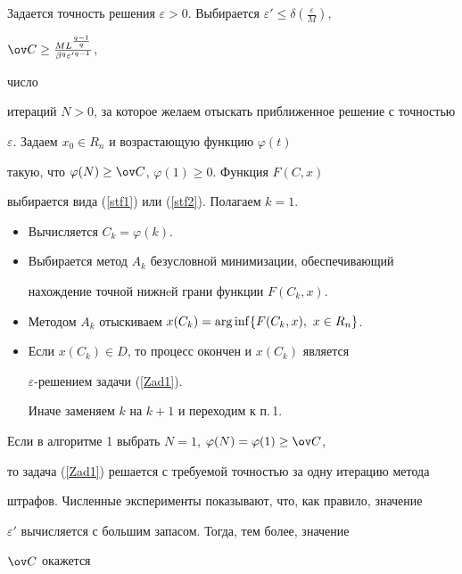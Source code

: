 \begin{algor}


Задается точность решения $\varepsilon>0$. Выбирается $\varepsilon'\leq


\delta(\frac{\varepsilon}{M})$, 


$\ov C\geq \frac{M L^{\frac{q-1}{q}}} {\beta^q {\varepsilon'}^{q-1} }$,


число


итераций $N>0$, за которое желаем отыскать приближенное решение с точностью


$\varepsilon$. Задаем $x_0\in R_n$ и возрастающую функцию $\varphi(t)$ 


такую, что $\varphi(N)\geq\ov C$, $\varphi(1)\geq 0$. Функция $F(C,x)$ 


выбирается вида (\ref{stf1}) или (\ref{stf2}). Полагаем $k=1$.


\begin{itemize}


\item[1.] Вычисляется $C_k=\varphi(k)$.


\item[2.] Выбирается метод $A_k$ безусловной минимизации, обеспечивающий


нахождение точной нижнeй грани функции $F(C_k,x)$.


\item[3.] Методом $A_k$ отыскиваем $x(C_k)=\operatorname{arg\,inf}\{F(C_k,x),\ x\in R_n\}$.


\item[4.] Если $x(C_k)\in D$, то процесс окончен и $x(C_k)$ является 


$\varepsilon$-решением задачи (\ref{Zad1}).


Иначе заменяем $k$ на $k+1$ и переходим к п.\,1.


\end{itemize}


\end{algor}





Если в алгоритме 1 выбрать $N=1$, $\varphi(N)=\varphi(1)\geq\ov C$,


то задача (\ref{Zad1}) решается с требуемой точностью за одну итерацию метода


штрафов. Численные эксперименты показывают, что, как правило, значение 


$\varepsilon'$ вычисляется с большим запасом. Тогда, тем более, значение 


$\ov C$ окажется 


